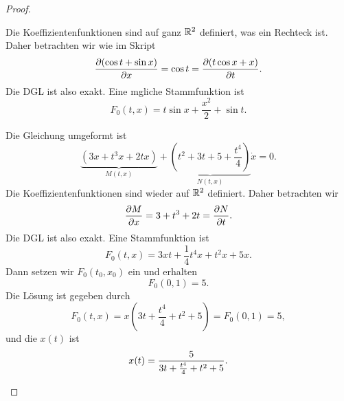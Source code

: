 \begin{proof}
	\begin{parts}
	\item Die Koeffizientenfunktionen sind auf ganz $\mathbb{R}^2$ definiert, was ein Rechteck ist. Daher betrachten wir wie im Skript
		\[
			\pdv{(\cos t+\sin x)}{x}=\cos t=\pdv{(t\cos x + x)}{t}
		.\] 
		Die DGL ist also exakt. Eine mgliche Stammfunktion ist
		\[
		F_0(t, x)=t\sin x+\frac{x^2}{2}+\sin t
		.\] 
	\item Die Gleichung umgeformt ist
		\[
			\underbrace{\left(3x+t^3x+2tx \right)}_{M(t, x)}+\underbrace{\left( t^2+3t+5+\frac{t^4}{4} \right)}_{N(t,x)}\dot{x}=0
		.\] 
Die Koeffizientenfunktionen sind wieder auf $\mathbb{R}^2$ definiert. Daher betrachten wir
\[
	\pdv{M}{x}=3+t^3+2t=\pdv{N}{t}
.\] 
Die DGL ist also exakt. Eine Stammfunktion ist
\[
F_0(t, x)=3xt+\frac{1}{4}t^4 x+t^2 x+5x
.\] 
Dann setzen wir $F_0(t_0, x_0)$ ein und erhalten
\[
F_0(0,1)=5
.\] 
Die Lösung ist gegeben durch
\[
F_0(t,x)=x\left( 3t+\frac{t^4}{4}+t^2+5 \right) =F_0(0,1)=5
,\] 
und die $x(t)$ ist
\[
x(t)=\frac{5}{3t+\frac{t^4}{4}+t^2+5}
.\qedhere\] 
	\end{parts}
\end{proof}


